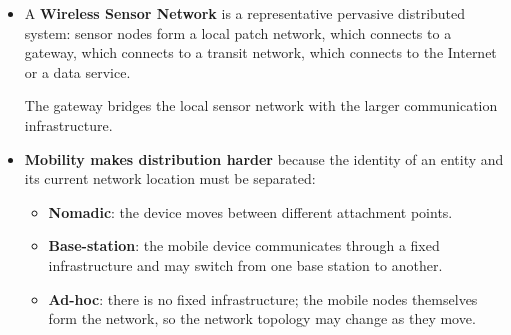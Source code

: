\begin{takeawaysbox}
\begin{itemize}
        \item A \textbf{Wireless Sensor Network} is a representative pervasive
            distributed system: sensor nodes form a local patch network, which connects to a gateway, which connects to a transit network, which connects to the Internet or a data service.

            The gateway bridges the local sensor network with the larger
            communication infrastructure.

        \item \textbf{Mobility makes distribution harder} because the identity
            of an entity and its current network location must be separated:
            \begin{itemize}

                \item \textbf{Nomadic}: the device moves between different
                    attachment points.

                \item \textbf{Base-station}: the mobile device communicates through
                    a fixed infrastructure and may switch from one base station to
                    another.

                \item \textbf{Ad-hoc}: there is no fixed infrastructure; the mobile
                    nodes themselves form the network, so the network topology may
                    change as they move.

            \end{itemize}

    \end{itemize}
\end{takeawaysbox}